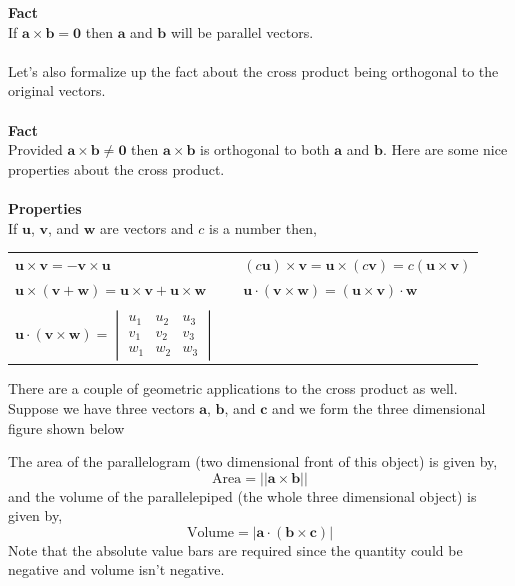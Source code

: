 \documentclass[10pt,reqno]{book}
\theoremstyle{definition}
\renewcommand{\vec}[1]{\mathbf{#1}}
\begin{document}
	\textbf{Fact}\\
	If $\vec{a} \times \vec{b} = \vec{0}$ then $\vec{a}$ and $\vec{b}$ will be parallel vectors.\\ \\
	Let's also formalize up the fact about the cross product being orthogonal to the original vectors.\\ \\
	\textbf{Fact}\\
	Provided $\vec{a} \times \vec{b} \neq \vec{0}$ then $\vec{a} \times \vec{b}$ is orthogonal to both $\vec{a}$ and $\vec{b}$. Here are some nice properties about the cross product.\\ \\
	\textbf{Properties}\\
	If $\vec{u}$, $\vec{v}$, and $\vec{w}$ are vectors and $c$ is a number then,
	\begin{center}
		\begin{tabular}{lcl}
			$\vec{u} \times \vec{v} = -\vec{v} \times \vec{u}$ & & $(c\vec{u}) \times \vec{v} = \vec{u} \times (c\vec{v}) = c (\vec{u} \times \vec{v}) $\\
			$ \vec{u} \times (\vec{v} + \vec{w}) = \vec{u} \times \vec{v} + \vec{u} \times \vec{w} $ & & $ \vec{u} \cdot (\vec{v} \times \vec{w}) = (\vec{u} \times \vec{v}) \cdot \vec{w} $\\ \\
			$\vec{u} \cdot (\vec{v} \times \vec{w}) = 
			\begin{vmatrix}
			u_1 & u_2 & u_3 \\
			v_1 & v_2 & v_3 \\ 
			w_1 & w_2 & w_3
			\end{vmatrix}$
		\end{tabular}
	\end{center}
	There are a couple of geometric applications to the cross product as well. Suppose we have three vectors $\vec{a}$, $\vec{b}$, and $\vec{c}$ and we form the three dimensional figure shown below

	\begin{center}
	\end{center}
	The area of the parallelogram (two dimensional front of this object) is given by,
	\[ \text{Area} = ||\vec{a} \times \vec{b} || \]
	and the volume of the parallelepiped (the whole three dimensional object) is given by,
	\[ \text{Volume} = \big| \vec{a} \cdot (\vec{b} \times \vec{c}) \big| \]
	Note that the absolute value bars are required since the quantity could be negative and volume isn't negative.
\end{document}
